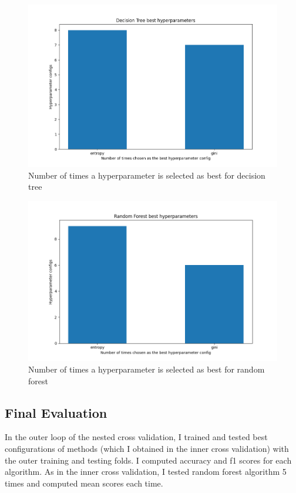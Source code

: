 \documentclass[12pt,a4paper, margin=1in]{article}
\begin{document}
\begin{figure}[H]
    \centering
    \includegraphics[scale=0.75]{dtree-hypr.png}
    \caption{Number of times a hyperparameter is selected as best for decision tree}
\end{figure}

\begin{figure}[H]
    \centering
    \includegraphics[scale=0.75]{randforest-hypr.png}
    \caption{Number of times a hyperparameter is selected as best for random forest}
\end{figure}

\subsection{Final Evaluation}

In the outer loop of the nested cross validation, I trained and tested best configurations of methods (which I obtained in the inner cross validation) with the outer training and testing folds.
I computed accuracy and f1 scores for each algorithm. As in the inner cross validation, I tested random forest algorithm 5 times and computed mean scores each time.
\end{document}
